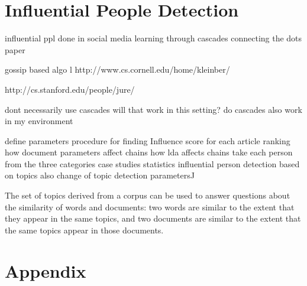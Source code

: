 \documentclass[letterpaper,11pt]{report}
\begin{document}
 

 

\chapter{Influential People Detection}\label{chapter:influential people detection}

influential ppl done in social media 
learning through cascades
connecting the dots paper




gossip based algo
l
http://www.cs.cornell.edu/home/kleinber/

http://cs.stanford.edu/people/jure/




dont necessarily use cascades
will that work in this setting?
do cascades also work in my environment


define parameters
procedure for finding Influence score for each article
ranking
how document parameters affect chains
how lda affects chains
take each person from the three categories
case studies
statistics
influential person detection based on topics also
change of topic detection parametersJ      
       
The set of topics derived from a corpus can be used to answer questions about the similarity of words and 
documents: two words are similar to the extent that they appear in the same topics, and two documents are similar to 
the extent that the same topics appear in those documents. 
                                                           

%

%
%


\chapter*{Appendix}\label{chapter:appendix} 
\end{document}
